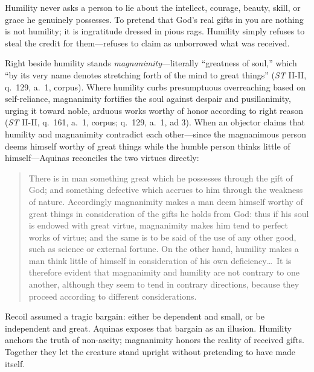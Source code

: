 Humility never asks a person to lie about the intellect, courage, beauty, skill, or grace he genuinely possesses. To pretend that God's real gifts in you are nothing is not humility; it is ingratitude dressed in pious rags. Humility simply refuses to steal the credit for them---refuses to claim as unborrowed what was received.

Right beside humility stands \emph{magnanimity}---literally ``greatness of soul,'' which ``by its very name denotes stretching forth of the mind to great things'' (\emph{ST} II-II, q.\ 129, a.\ 1, corpus). Where humility curbs presumptuous overreaching based on self-reliance, magnanimity fortifies the soul against despair and pusillanimity, urging it toward noble, arduous works worthy of honor according to right reason (\emph{ST} II-II, q.\ 161, a.\ 1, corpus; q.\ 129, a.\ 1, ad 3). When an objector claims that humility and magnanimity contradict each other---since the magnanimous person deems himself worthy of great things while the humble person thinks little of himself---Aquinas reconciles the two virtues directly:

\begin{quote}
There is in man something great which he possesses through the gift of God; and something defective which accrues to him through the weakness of nature. Accordingly magnanimity makes a man deem himself worthy of great things in consideration of the gifts he holds from God: thus if his soul is endowed with great virtue, magnanimity makes him tend to perfect works of virtue; and the same is to be said of the use of any other good, such as science or external fortune. On the other hand, humility makes a man think little of himself in consideration of his own deficiency\dots\ It is therefore evident that magnanimity and humility are not contrary to one another, although they seem to tend in contrary directions, because they proceed according to different considerations.
\end{quote}

Recoil assumed a tragic bargain: either be dependent and small, or be independent and great. Aquinas exposes that bargain as an illusion. Humility anchors the truth of non-aseity; magnanimity honors the reality of received gifts. Together they let the creature stand upright without pretending to have made itself.

